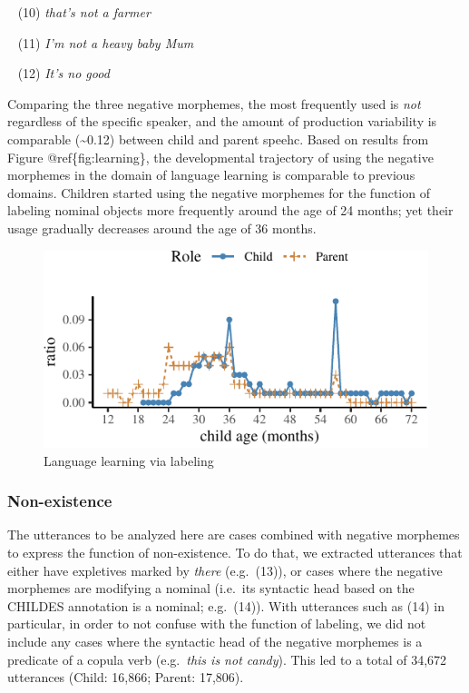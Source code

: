\documentclass[10pt, letterpaper]{article}
\newenvironment{CodeChunk}{}{}
\begin{document}
~ (10) \emph{that's not a farmer}

~ (11) \emph{I'm not a heavy baby Mum}

~ (12) \emph{It's no good}

Comparing the three negative morphemes, the most frequently used is
\emph{not} regardless of the specific speaker, and the amount of
production variability is comparable (\textasciitilde0.12) between child
and parent speehc. Based on results from Figure @ref\{fig:learning\},
the developmental trajectory of using the negative morphemes in the
domain of language learning is comparable to previous domains. Children
started using the negative morphemes for the function of labeling
nominal objects more frequently around the age of 24 months; yet their
usage gradually decreases around the age of 36 months.

\begin{CodeChunk}
\begin{figure}[H]

{\centering \includegraphics{figs/learning-1} 

}

\caption[Language learning via labeling]{Language learning via labeling}\label{fig:learning}
\end{figure}
\end{CodeChunk}

\hypertarget{non-existence}{%
\subsubsection{Non-existence}\label{non-existence}}

The utterances to be analyzed here are cases combined with negative
morphemes to express the function of non-existence. To do that, we
extracted utterances that either have expletives marked by \emph{there}
(e.g.~(13)), or cases where the negative morphemes are modifying a
nominal (i.e.~its syntactic head based on the CHILDES annotation is a
nominal; e.g.~(14)). With utterances such as (14) in particular, in
order to not confuse with the function of labeling, we did not include
any cases where the syntactic head of the negative morphemes is a
predicate of a copula verb (e.g.~\emph{this is not candy}). This led to
a total of 34,672 utterances (Child: 16,866; Parent: 17,806).
\end{document}
